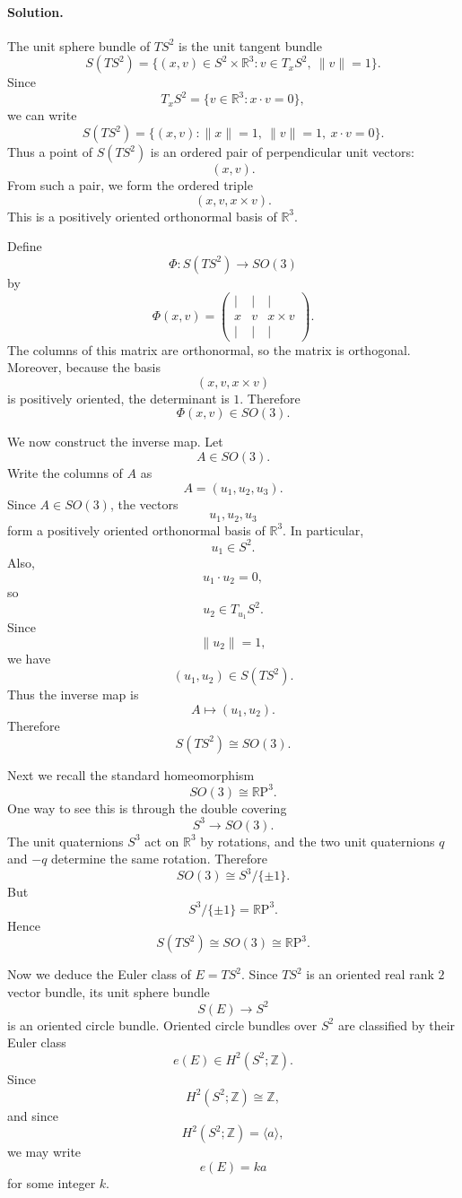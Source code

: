\documentclass[12pt,a4paper]{article}
\newcommand{\RP}{\mathbb{R}\mathrm{P}}
\theoremstyle{notespace}
\begin{document}
	\paragraph{Solution.}
	The unit sphere bundle of \(TS^{2}\) is the unit tangent bundle
	\[
	S(TS^{2})
	=
	\{(x,v)\in S^{2}\times \mathbb R^{3}:v\in T_{x}S^{2},\ \|v\|=1\}.
	\]
	Since
	\[
	T_{x}S^{2}
	=
	\{v\in \mathbb R^{3}:x\cdot v=0\},
	\]
	we can write
	\[
	S(TS^{2})
	=
	\{(x,v):\|x\|=1,\ \|v\|=1,\ x\cdot v=0\}.
	\]
	Thus a point of \(S(TS^{2})\) is an ordered pair of perpendicular unit vectors:
	\[
	(x,v).
	\]
	From such a pair, we form the ordered triple
	\[
	(x,v,x\times v).
	\]
	This is a positively oriented orthonormal basis of \(\mathbb R^{3}\).
	
	Define
	\[
	\Phi:S(TS^{2})\to SO(3)
	\]
	by
	\[
	\Phi(x,v)
	=
	\begin{pmatrix}
		|&|&|\\
		x&v&x\times v\\
		|&|&|
	\end{pmatrix}.
	\]
	The columns of this matrix are orthonormal, so the matrix is orthogonal. Moreover, because the basis
	\[
	(x,v,x\times v)
	\]
	is positively oriented, the determinant is \(1\). Therefore
	\[
	\Phi(x,v)\in SO(3).
	\]
	
	We now construct the inverse map. Let
	\[
	A\in SO(3).
	\]
	Write the columns of \(A\) as
	\[
	A=(u_{1},u_{2},u_{3}).
	\]
	Since \(A\in SO(3)\), the vectors
	\[
	u_{1},u_{2},u_{3}
	\]
	form a positively oriented orthonormal basis of \(\mathbb R^{3}\). In particular,
	\[
	u_{1}\in S^{2}.
	\]
	Also,
	\[
	u_{1}\cdot u_{2}=0,
	\]
	so
	\[
	u_{2}\in T_{u_{1}}S^{2}.
	\]
	Since
	\[
	\|u_{2}\|=1,
	\]
	we have
	\[
	(u_{1},u_{2})\in S(TS^{2}).
	\]
	Thus the inverse map is
	\[
	A\mapsto (u_{1},u_{2}).
	\]
	Therefore
	\[
	\boxed{S(TS^{2})\cong SO(3).}
	\]
	
	Next we recall the standard homeomorphism
	\[
	SO(3)\cong \RP^{3}.
	\]
	One way to see this is through the double covering
	\[
	S^{3}\to SO(3).
	\]
	The unit quaternions \(S^{3}\) act on \(\mathbb R^{3}\) by rotations, and the two unit quaternions \(q\) and \(-q\) determine the same rotation. Therefore
	\[
	SO(3)\cong S^{3}/\{\pm 1\}.
	\]
	But
	\[
	S^{3}/\{\pm 1\}=\RP^{3}.
	\]
	Hence
	\[
	\boxed{S(TS^{2})\cong SO(3)\cong \RP^{3}.}
	\]
	
	Now we deduce the Euler class of \(E=TS^{2}\). Since \(TS^{2}\) is an oriented real rank \(2\) vector bundle, its unit sphere bundle
	\[
	S(E)\to S^{2}
	\]
	is an oriented circle bundle. Oriented circle bundles over \(S^{2}\) are classified by their Euler class
	\[
	e(E)\in H^{2}(S^{2};\mathbb Z).
	\]
	Since
	\[
	H^{2}(S^{2};\mathbb Z)\cong \mathbb Z,
	\]
	and since
	\[
	H^{2}(S^{2};\mathbb Z)=\langle a\rangle,
	\]
	we may write
	\[
	e(E)=ka
	\]
	for some integer \(k\).
	
\end{document}
